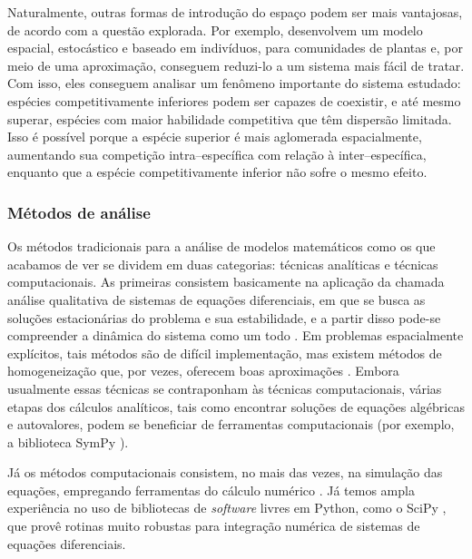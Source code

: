 \documentclass[12pt]{extarticle}
\begin{document}
Naturalmente, outras formas de introdução do espaço podem ser mais vantajosas,
de acordo com a questão explorada. Por exemplo, \citet{law2000} desenvolvem um
modelo espacial, estocástico e baseado em indivíduos, para comunidades de
plantas e, por meio de uma aproximação, conseguem reduzi-lo a um sistema mais
fácil de tratar. Com isso, eles conseguem analisar um fenômeno importante do
sistema estudado: espécies competitivamente inferiores podem ser capazes de
coexistir, e até mesmo superar, espécies com maior habilidade competitiva que
têm dispersão limitada. Isso é possível porque a espécie superior é mais
aglomerada espacialmente, aumentando sua competição intra--específica com
relação à inter--específica, enquanto que a espécie competitivamente inferior
não sofre o mesmo efeito.

\subsubsection*{Métodos de análise}

%
%


Os métodos tradicionais para a análise de modelos matemáticos como os que
acabamos de ver se dividem em duas categorias: técnicas
analíticas e técnicas computacionais. As primeiras consistem basicamente na
aplicação da chamada análise qualitativa de sistemas de equações diferenciais,
em que se busca as soluções estacionárias do problema e sua estabilidade, e a
partir disso pode-se compreender a dinâmica do sistema como um todo
\citep{murray2002}. Em problemas espacialmente explícitos, tais métodos são de
difícil implementação, mas existem métodos de homogeneização que, por vezes,
oferecem boas aproximações \citep{cobbold2014}. Embora usualmente essas
técnicas se contraponham às técnicas computacionais, várias etapas dos
cálculos analíticos, tais como encontrar soluções de equações algébricas e
autovalores, podem se beneficiar de ferramentas computacionais (por exemplo, a
biblioteca SymPy \citep{sympy}).

Já os métodos computacionais consistem, no mais das vezes, na simulação das
equações, empregando ferramentas do cálculo numérico \citep{iserles2009}. Já
temos ampla experiência no uso de bibliotecas de \emph{software} livres em
Python, como o SciPy \citep{scipy}, que provê rotinas muito robustas para
integração numérica de sistemas de equações diferenciais.
\end{document}
